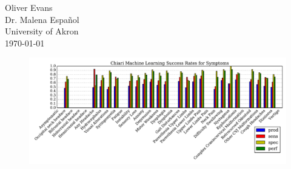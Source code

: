 \documentclass{article}
\begin{document}
\noindent
Oliver Evans \\
Dr. Malena Espa\~{n}ol \\
University of Akron \\
\today

\begin{figure}[H]
    \centering
    \includegraphics[width=\textwidth]{symptom_success_plot.pdf}
    
\end{figure}
\end{document}
